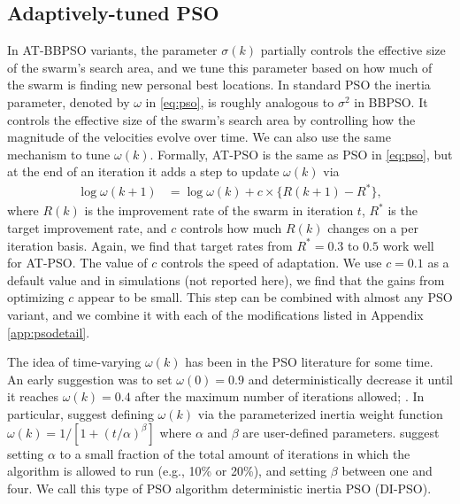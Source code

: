 \documentclass[cmbright]{staauth}
\begin{document}
\subsection{Adaptively-tuned PSO}\label{sec:AT-PSO}
In AT-BBPSO variants, the parameter $\sigma(k)$ partially controls the effective size of the swarm's search area, and we tune this parameter based on how much of the swarm is finding new personal best locations. In standard PSO the inertia parameter, denoted by $\omega$ in \eqref{eq:pso}, is roughly analogous to $\sigma^2$ in BBPSO. It controls the effective size of the swarm's search area by controlling how the magnitude of the velocities evolve over time. We can also use the same mechanism to tune $\omega(k)$. Formally, AT-PSO is the same as PSO in \eqref{eq:pso}, but at the end of an iteration it adds a step to update $\omega(k)$ via
\begin{align}\label{eq:atpso}
\log\omega(k+1)& = \log\omega(k) + c\times\{R(k+1) - R^*\},
\end{align}
where $R(k)$ is the improvement rate of the swarm in iteration $t$, $R^*$ is the target improvement rate, and $c$ controls how much $R(k)$ changes on a per iteration basis. Again, we find that target rates from $R^*=0.3$ to $0.5$ work well for AT-PSO. The value of $c$ controls the speed of adaptation. We use $c=0.1$ as a default value and in simulations (not reported here), we find that the gains from optimizing $c$ appear to be small. This step can be combined with almost any PSO variant, and we combine it with each of the modifications listed in Appendix \ref{app:psodetail}.

The idea of time-varying $\omega(k)$ has been in the PSO literature for some time. An early suggestion was to set $\omega(0)=0.9$ and deterministically decrease it until it reaches $\omega(k)=0.4$ after the maximum number of iterations allowed; \cite{eberhart2000comparing}. In particular, \cite{tuppadung2011comparing} suggest defining $\omega(k)$ via the parameterized inertia weight function $\omega(k) = 1/\left[1 + (t/\alpha)^{\beta}\right]$ where $\alpha$ and $\beta$ are user-defined parameters. \cite{tuppadung2011comparing} suggest setting $\alpha$ to a small fraction of the total amount of iterations in which the algorithm is allowed to run (e.g., 10\% or 20\%), and setting $\beta$ between one and four. We call this type of PSO algorithm deterministic inertia PSO (DI-PSO).
\end{document}
